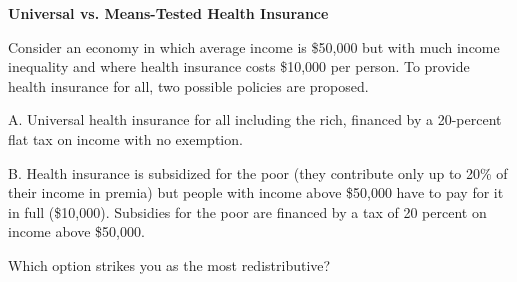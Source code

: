\documentclass[landscape]{slides}
\begin{document}
\begin{slide}

\end{slide}

\begin{slide}
\begin{center}
{\bf Universal vs. Means-Tested Health Insurance}
\end{center}

Consider an economy in which average income is \$50,000 but with much income inequality and where health insurance costs \$10,000 per person. To provide health insurance for all, two possible policies are proposed.

A.  Universal health insurance for all including the rich, financed by a 20-percent flat tax on income with no exemption.

B.  Health insurance is subsidized for the poor (they contribute only up to 20\% of their income in premia) but people with income above \$50,000 have to pay for it in full (\$10,000). Subsidies for the poor are financed by a tax of 20 percent on income above \$50,000.

Which option strikes you as the most redistributive?

\end{slide}
\end{document}
